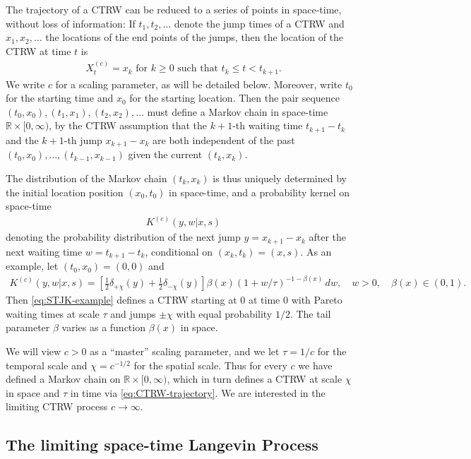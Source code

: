 \documentclass[a4paper,12pt]{article}
\numberwithin{equation}{section}
\theoremstyle{plain}
\theoremstyle{definition}
\theoremstyle{remark}
\numberwithin{equation}{section}
\newcommand{\spc}{\mathbb R}
\newcommand{\spctim}{\spc \times [0,\infty)}
\newcommand{\1}{\mathbf 1}
\begin{document}
The trajectory of a CTRW can be reduced to a series of points in
space-time, without loss of information: If $t_1, t_2, \ldots$
denote the jump times of a CTRW and $x_1, x_2, \ldots$ the locations
of the end points of the jumps, then the location of the CTRW at time
$t$ is
\begin{align} \label{eq:CTRW-trajectory}
X^{(c)}_t = x_k \text{ for } k \ge 0 \text{ such that }
t_k \le t < t_{k+1}.
\end{align}
We write $c$ for a scaling parameter, as will be detailed below.
Moreover, write $t_0$ for the starting time and $x_0$ for the starting
location. Then the pair sequence
$(t_0, x_0), (t_1, x_1), (t_2, x_2), \ldots$
must define a Markov chain in space-time $\spctim$,
by the CTRW assumption that the $k+1$-th waiting time $t_{k+1} - t_k$
and the $k+1$-th jump $x_{k+1} - x_k$ are both independent of the past
$(t_0, x_0), \ldots, (t_{k-1}, x_{k-1})$ given the current $(t_k, x_k)$.

The distribution of the Markov chain $(t_k, x_k)$ is thus uniquely
determined by the initial location position $(x_0, t_0)$ in space-time,
and a probability kernel on space-time
\begin{align} \label{eq:STJK}
K^{(c)}(y,w | x,s)
\end{align}
denoting the probability distribution of the next jump 
$y = x_{k+1} - x_k$ after the next waiting time
$w = t_{k+1} - t_k$, conditional on $(x_k, t_k) = (x,s)$.
As an example, let $(t_0, x_0) = (0,0)$ and
\begin{align} \label{eq:STJK-example}
K^{(c)}(y,w | x,s) = \left[\frac{1}{2} \delta_{+\chi}(y) + \frac{1}{2} \delta_{-\chi}(y)\right] \beta(x) (1+w/\tau)^{-1-\beta(x)} \, dw,
\quad w > 0, \quad \beta(x) \in (0,1).
\end{align}
Then \eqref{eq:STJK-example} defines a CTRW starting at $0$ at time $0$ with Pareto waiting times at scale
$\tau$ and jumps $\pm \chi$ with equal probability $1/2$.  The tail parameter 
$\beta$ varies as a function $\beta(x)$ in space. 


We will view $c > 0$ as a ``master'' scaling parameter, and we let
$\tau = 1/c$ for the temporal scale and $\chi = c^{-1/2}$ for the
spatial scale.
Thus for every $c$ we have defined a Markov chain on $\spctim$, which
in turn defines a CTRW at scale $\chi$ in space and $\tau$ in time
via \eqref{eq:CTRW-trajectory}.
We are interested in the limiting CTRW process $c \to \infty$.


\subsection{The limiting space-time Langevin Process}
\end{document}
